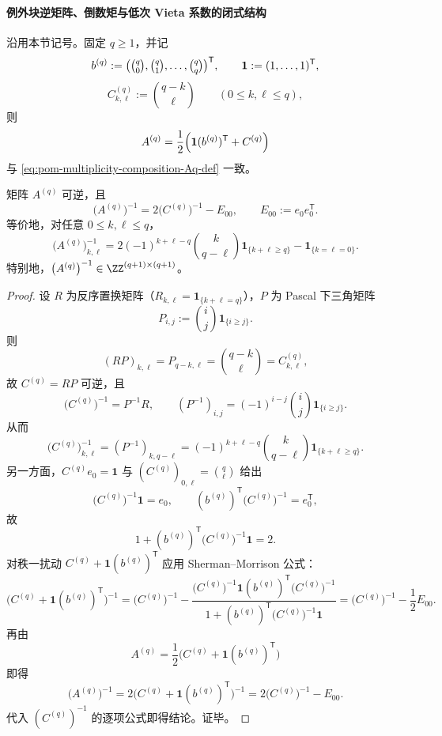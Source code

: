 \paragraph{例外块逆矩阵、倒数矩与低次 Vieta 系数的闭式结构}
沿用本节记号。固定 \(q\ge 1\)，并记
\[
b^{(q)}:=\bigl(\tbinom q0,\tbinom q1,\dots,\tbinom qq\bigr)^{\mathsf T},\qquad
\mathbf 1:=(1,\dots,1)^{\mathsf T},
\]
\[
C^{(q)}_{k,\ell}:=\binom{q-k}{\ell}\qquad(0\le k,\ell\le q),
\]
则
\[
A^{(q)}=\frac12\Bigl(\mathbf 1(b^{(q)})^{\mathsf T}+C^{(q)}\Bigr)
\]
与 \eqref{eq:pom-multiplicity-composition-Aq-def} 一致。

\begin{theorem}[例外块的整系数逆矩阵闭式]\label{thm:xi-replica-softcore-exceptional-block-inverse-integral-closed}
矩阵 \(A^{(q)}\) 可逆，且
\[
\bigl(A^{(q)}\bigr)^{-1}=2\bigl(C^{(q)}\bigr)^{-1}-E_{00},
\qquad
E_{00}:=e_0e_0^{\mathsf T}.
\]
等价地，对任意 \(0\le k,\ell\le q\)，
\[
\bigl(A^{(q)}\bigr)^{-1}_{k,\ell}
=2(-1)^{k+\ell-q}\binom{k}{q-\ell}\mathbf 1_{\{k+\ell\ge q\}}
-\mathbf 1_{\{k=\ell=0\}}.
\]
特别地，\(\bigl(A^{(q)}\bigr)^{-1}\in\ZZ^{(q+1)\times(q+1)}\)。
\end{theorem}
\begin{proof}
设 \(R\) 为反序置换矩阵（\(R_{k,\ell}=\mathbf 1_{\{k+\ell=q\}}\)），\(P\) 为 Pascal 下三角矩阵
\[
P_{i,j}:=\binom{i}{j}\mathbf 1_{\{i\ge j\}}.
\]
则
\[
(RP)_{k,\ell}=P_{q-k,\ell}=\binom{q-k}{\ell}=C^{(q)}_{k,\ell},
\]
故 \(C^{(q)}=RP\) 可逆，且
\[
\bigl(C^{(q)}\bigr)^{-1}=P^{-1}R,\qquad
(P^{-1})_{i,j}=(-1)^{i-j}\binom{i}{j}\mathbf 1_{\{i\ge j\}}.
\]
从而
\[
\bigl(C^{(q)}\bigr)^{-1}_{k,\ell}
=(P^{-1})_{k,q-\ell}
=(-1)^{k+\ell-q}\binom{k}{q-\ell}\mathbf 1_{\{k+\ell\ge q\}}.
\]
另一方面，\(C^{(q)}e_0=\mathbf 1\) 与 \((C^{(q)})_{0,\ell}=\binom q\ell\) 给出
\[
\bigl(C^{(q)}\bigr)^{-1}\mathbf 1=e_0,\qquad
(b^{(q)})^{\mathsf T}\bigl(C^{(q)}\bigr)^{-1}=e_0^{\mathsf T},
\]
故
\[
1+(b^{(q)})^{\mathsf T}\bigl(C^{(q)}\bigr)^{-1}\mathbf 1=2.
\]
对秩一扰动 \(C^{(q)}+\mathbf 1(b^{(q)})^{\mathsf T}\) 应用 Sherman--Morrison 公式：
\[
\bigl(C^{(q)}+\mathbf 1(b^{(q)})^{\mathsf T}\bigr)^{-1}
=\bigl(C^{(q)}\bigr)^{-1}
-\frac{\bigl(C^{(q)}\bigr)^{-1}\mathbf 1(b^{(q)})^{\mathsf T}\bigl(C^{(q)}\bigr)^{-1}}
{1+(b^{(q)})^{\mathsf T}\bigl(C^{(q)}\bigr)^{-1}\mathbf 1}
=\bigl(C^{(q)}\bigr)^{-1}-\frac12E_{00}.
\]
再由
\[
A^{(q)}=\frac12\bigl(C^{(q)}+\mathbf 1(b^{(q)})^{\mathsf T}\bigr)
\]
即得
\[
\bigl(A^{(q)}\bigr)^{-1}
=2\bigl(C^{(q)}+\mathbf 1(b^{(q)})^{\mathsf T}\bigr)^{-1}
=2\bigl(C^{(q)}\bigr)^{-1}-E_{00}.
\]
代入 \((C^{(q)})^{-1}\) 的逐项公式即得结论。证毕。
\end{proof}

